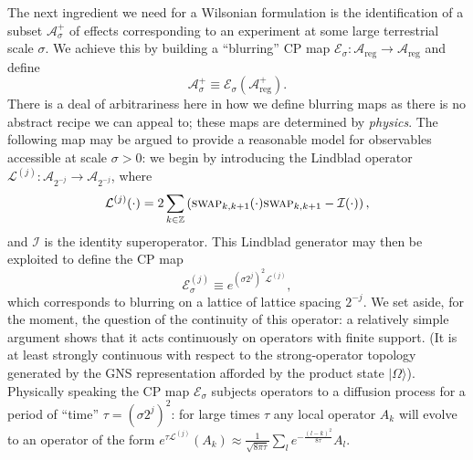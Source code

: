 \documentclass[11pt]{amsart}
\theoremstyle{plain}%
\theoremstyle{definition}
\theoremstyle{remark}
\begin{document}
The next ingredient we need for a Wilsonian formulation is the identification of a subset $\mathcal{A}_\sigma^+$ of effects corresponding to an experiment at some large terrestrial scale $\sigma$. We achieve this by building a ``blurring'' CP map $\mathcal{E}_{\sigma}:\mathcal{A}_{\text{reg}}\rightarrow \mathcal{A}_{\text{reg}}$ and define 
\begin{equation}
	\mathcal{A}_\sigma^+ \equiv \mathcal{E}_{\sigma}(\mathcal{A}_{\text{reg}}^+).
\end{equation}
There is a deal of arbitrariness here in how we define blurring maps as there is no abstract recipe we can appeal to; these maps are determined by \emph{physics}. The following map may be argued to provide a reasonable model for observables accessible at scale $\sigma > 0$: we begin by introducing the Lindblad operator $\mathcal{L}^{(j)}:\mathcal{A}_{2^{-j}} \rightarrow \mathcal{A}_{2^{-j}}$, where
\begin{equation}
	\mathcal{L}^{(j)}(\cdot) = 2\sum_{k\in \mathbb{Z}} \left(\textsc{swap}_{k,k+1}(\cdot)\textsc{swap}_{k,k+1} - \mathcal{I}(\cdot)\right),
\end{equation}
and $\mathcal{I}$ is the identity superoperator. This Lindblad generator may then be exploited to define the CP map
\begin{equation}
	\mathcal{E}_\sigma^{(j)} \equiv e^{(\sigma 2^{j})^2\mathcal{L}^{(j)}},
\end{equation} 
which corresponds to blurring on a lattice of lattice spacing $2^{-j}$.
We set aside, for the moment, the question of the continuity of this operator: a relatively simple argument shows that it acts continuously on operators with finite support. (It is at least strongly continuous with respect to the strong-operator topology generated by the GNS representation afforded by the product state $|\Omega\rangle$). Physically speaking the CP map $\mathcal{E}_{\sigma}$ subjects operators to a diffusion process for a period of ``time'' $\tau = (\sigma 2^{j})^2$: for large times $\tau$ any local operator $A_k$ will evolve to an operator of the form $e^{\tau\mathcal{L}^{(j)}}(A_k) \approx \frac{1}{\sqrt{8\pi \tau}}\sum_l e^{-\frac{(l-k)^2}{8\tau}} A_l$.
\end{document}
